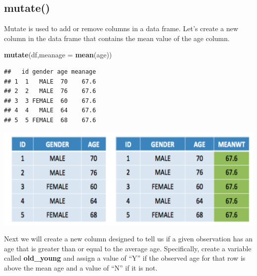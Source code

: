 \documentclass[]{book}
\newenvironment{Shaded}{\begin{snugshade}}{\end{snugshade}}
\newcommand{\DataTypeTok}[1]{\textcolor[rgb]{0.13,0.29,0.53}{#1}}
\newcommand{\KeywordTok}[1]{\textcolor[rgb]{0.13,0.29,0.53}{\textbf{#1}}}
\newcommand{\NormalTok}[1]{#1}
\newcommand{\OperatorTok}[1]{\textcolor[rgb]{0.81,0.36,0.00}{\textbf{#1}}}
\newcommand{\StringTok}[1]{\textcolor[rgb]{0.31,0.60,0.02}{#1}}
\begin{document}
\hypertarget{mutate}{%
\subsection{mutate()}\label{mutate}}

Mutate is used to add or remove columns in a data frame. Let's create a new column in the data frame that contains the mean value of the age column.

\begin{Shaded}
\begin{Highlighting}[]
\KeywordTok{mutate}\NormalTok{(df,}\DataTypeTok{meanage =} \KeywordTok{mean}\NormalTok{(age))}
\end{Highlighting}
\end{Shaded}

\begin{verbatim}
##   id gender age meanage
## 1  1   MALE  70    67.6
## 2  2   MALE  76    67.6
## 3  3 FEMALE  60    67.6
## 4  4   MALE  64    67.6
## 5  5 FEMALE  68    67.6
\end{verbatim}

\includegraphics{./figures/meanage.png}

Next we will create a new column designed to tell us if a given observation has an age that is greater than or equal to the average age. Specifically, create a variable called \textbf{old\_young} and assign a value of ``Y'' if the observed age for that row is above the mean age and a value of ``N'' if it is not.

\begin{Shaded}
\end{Shaded}
\end{document}

